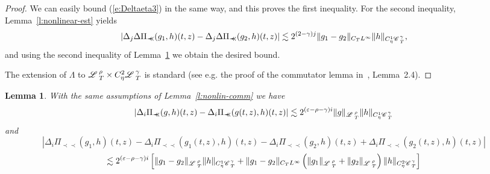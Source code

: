 \documentclass[11pt,reqno]{amsart}
\newcommand{\precprec}{\prec\!\!\!\prec}
\newtheorem{lemma}[theorem]{Lemma}
\newcommand{\CC}{\mathscr{C} \hspace{.1em}}
\newcommand{\LL}{\mathscr{L} \hspace{.2em}}
\begin{document}
\begin{proof}
  We can easily bound (\ref{e:Deltaeta3}) in the same way, and this proves the
  first inequality. For the second inequality, Lemma~\ref{l:nonlinear-est}
  yields
  \[ | \Delta_j \Delta \Pi_{\precprec} (g_1, h) (t, z) - \Delta_j \Delta
     \Pi_{\precprec} (g_2, h) (t, z) | \lesssim 2^{(2 - \gamma) j} \| g_1 -
     g_2 \|_{C_T L^{\infty}} \| h \|_{C^1_{\eta} \CC^{\gamma}_T}, \]
  and using the second inequality of Lemma~\ref{l:para-increment} we obtain
  the desired bound.
  
  The extension of $\Lambda$ to $\LL^{\rho}_T \times C_{\eta}^2
  \LL_T^{\gamma}$ is standard (see e.g. the proof of the commutator lemma
  in~{\cite{gubinelli_paracontrolled_2015}}, Lemma~2.4). 
\end{proof}

\begin{lemma}
  \label{l:para-increment}With the same assumptions of
  Lemma~\ref{l:nonlin-comm} we have
  \[ | \Delta_i \Pi_{\precprec} (g, h) (t, z) - \Delta_i \Pi_{\precprec} (g
     (t, z), h) (t, z) | \lesssim 2^{(\varepsilon - \rho - \gamma) i} \| g
     \|_{\LL^{\rho}_T} \| h \|_{C_{\eta}^1 \CC^{\gamma}_{_T}} \]
  and
  \[ \left| \Delta_i \Pi_{\precprec} (g_1, h) (t, z) - \Delta_i
     \Pi_{\precprec} (g_1 (t, z), h) (t, z) - \Delta_i \Pi_{\precprec} (g_2,
     h) (t, z) + \Delta_i \Pi_{\precprec} (g_2 (t, z), h) (t, z) \right| \]
  \[ \lesssim 2^{(\varepsilon - \rho - \gamma) i} \left[ \| g_1 - g_2
     \|_{\LL^{\rho}_T} \| h \|_{C_{\eta}^1 \CC^{\gamma}_T} + \| g_1 - g_2
     \|_{C_T L^{\infty}} \left( \| g_1 \|_{\LL^{\rho}_T} + \| g_2
     \|_{\LL^{\rho}_T} \right) \| h \|_{C_{\eta}^2 \CC^{\gamma}_T} \right] \]
\end{lemma}
\end{document}
